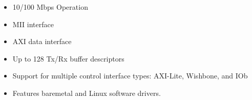 %

\begin{itemize}
\item 10/100 Mbps Operation
\item MII interface
\item AXI data interface
\item Up to 128 Tx/Rx buffer descriptors
\item Support for multiple control interface types: AXI-Lite, Wishbone, and IOb
\item Features baremetal and Linux software drivers.
\end{itemize}
